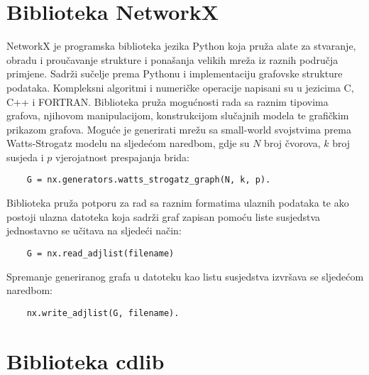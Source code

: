 \section{Biblioteka NetworkX}
NetworkX \cite{SciPyProceedings_11} je programska biblioteka jezika Python koja pruža alate za stvaranje, obradu i proučavanje strukture i ponašanja velikih mreža iz raznih područja primjene. Sadrži sučelje prema Pythonu i implementaciju grafovske strukture podataka. Kompleksni algoritmi i numeričke operacije napisani su u jezicima C, C++ i FORTRAN. Biblioteka pruža mogućnosti rada sa raznim tipovima grafova, njihovom manipulacijom, konstrukcijom slučajnih modela te grafičkim prikazom grafova. Moguće je generirati mrežu sa small-world svojstvima prema Watts-Strogatz modelu na sljedećom naredbom, gdje su $N$ broj čvorova, $k$ broj susjeda i $p$ vjerojatnost prespajanja brida:
\begin{verbatim}
	G = nx.generators.watts_strogatz_graph(N, k, p).
\end{verbatim}
Biblioteka pruža potporu za rad sa raznim formatima ulaznih podataka te ako postoji ulazna datoteka koja sadrži graf zapisan pomoću liste susjedstva jednostavno se učitava na sljedeći način: 
\begin{verbatim}
	G = nx.read_adjlist(filename)
\end{verbatim}
Spremanje generiranog grafa u datoteku kao listu susjedstva izvršava se sljedećom naredbom:
\begin{verbatim}
	nx.write_adjlist(G, filename).
\end{verbatim}


\section{Biblioteka cdlib}